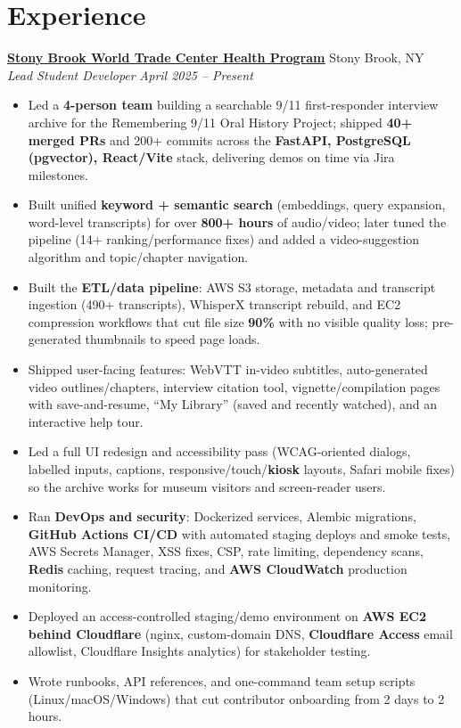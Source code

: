 \documentclass[letterpaper,10pt]{article}
\newcommand{\role}[4]{%
  \textbf{\underline{#1}} \hfill #2\\
  \textit{#3} \hfill \textit{#4}\vspace{-1pt}}
\begin{document}
\section{Experience}
\role{\href{https://www.stonybrookmedicine.edu/WTC}{Stony Brook World Trade Center Health Program}}{Stony Brook, NY}{Lead Student Developer}{April 2025 -- Present}
\begin{itemize}
  \item Led a \textbf{4-person team} building a searchable 9/11 first-responder interview archive for the Remembering 9/11 Oral History Project; shipped \textbf{40+ merged PRs} and 200+ commits across the \textbf{FastAPI, PostgreSQL (pgvector), React/Vite} stack, delivering demos on time via Jira milestones.
  \item Built unified \textbf{keyword + semantic search} (embeddings, query expansion, word-level transcripts) for over \textbf{800+ hours} of audio/video; later tuned the pipeline (14+ ranking/performance fixes) and added a video-suggestion algorithm and topic/chapter navigation.
  \item Built the \textbf{ETL/data pipeline}: AWS S3 storage, metadata and transcript ingestion (490+ transcripts), WhisperX transcript rebuild, and EC2 compression workflows that cut file size \textbf{90\%} with no visible quality loss; pre-generated thumbnails to speed page loads.
  \item Shipped user-facing features: WebVTT in-video subtitles, auto-generated video outlines/chapters, interview citation tool, vignette/compilation pages with save-and-resume, ``My Library'' (saved and recently watched), and an interactive help tour.
  \item Led a full UI redesign and accessibility pass (WCAG-oriented dialogs, labelled inputs, captions, responsive/touch/\textbf{kiosk} layouts, Safari mobile fixes) so the archive works for museum visitors and screen-reader users.
  \item Ran \textbf{DevOps and security}: Dockerized services, Alembic migrations, \textbf{GitHub Actions CI/CD} with automated staging deploys and smoke tests, AWS Secrets Manager, XSS fixes, CSP, rate limiting, dependency scans, \textbf{Redis} caching, request tracing, and \textbf{AWS CloudWatch} production monitoring.
  \item Deployed an access-controlled staging/demo environment on \textbf{AWS EC2 behind Cloudflare} (nginx, custom-domain DNS, \textbf{Cloudflare Access} email allowlist, Cloudflare Insights analytics) for stakeholder testing.
  \item Wrote runbooks, API references, and one-command team setup scripts (Linux/macOS/Windows) that cut contributor onboarding from 2 days to 2 hours.
\end{itemize}
\end{document}
